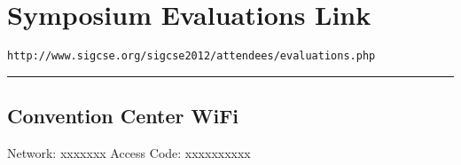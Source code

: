 {\centering
	\section*{Symposium Evaluations Link}
	\verb~http://www.sigcse.org/sigcse2012/attendees/evaluations.php~
}


\noindent\rule{5in}{0.02cm}

\begin{center}
	\section*{Convention Center WiFi}
	Network: xxxxxxx Access Code:  xxxxxxxxxx
\end{center}

